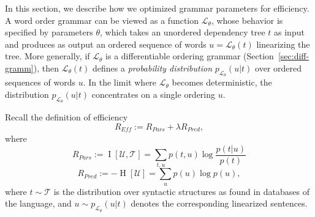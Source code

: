 \documentclass[10pt,twoside,lineno]{article}
\newcommand{\utterance}{\mathcal{U}}
\newcommand{\tree}{\mathcal{T}}
\begin{document}
In this section, we describe how we optimized grammar parameters for efficiency.
A word order grammar can be viewed as a function $\mathcal{L}_\theta$, whose behavior is specified by parameters $\theta$, which takes an unordered dependency tree $t$ as input and produces as output an ordered sequence of words $u = \mathcal{L}_\theta(t)$ linearizing the tree.
More generally, if $\mathcal{L}_\theta$ is a differentiable ordering grammar (Section~\ref{sec:diff-gramm}), then $\mathcal{L}_\theta(t)$ defines a \emph{probability distribution} $p_{\mathcal{L}_\theta}(u|t)$ over ordered sequences of words $u$.
In the limit where $\mathcal{L}_\theta$ becomes deterministic, the distribution $p_{\mathcal{L}_\theta}(u|t)$ concentrates on a single ordering $u$.

Recall the definition of efficiency
\begin{equation}\label{eq:efficiency-recall}
	R_{\textit{Eff}} := R_{\textit{Pars}} + \lambda R_\textit{Pred},
\end{equation}
where
\begin{equation}\label{eq:rpars}
	R_{Pars} := \operatorname{I}[\utterance,\tree] = \sum_{t,u} p(t,u) \log \frac{p(t|u)}{p(t)} 
\end{equation}
\begin{equation}
	R_{Pred} := - \operatorname{H}[\utterance] = \sum_{u} p(u) \log p(u),
\end{equation}
where $t \sim \tree$ is the distribution over syntactic structures as found in databases of the language, and $u \sim p_{\mathcal{L}_\theta}(u|t)$ denotes the corresponding linearized sentences.
\end{document}
